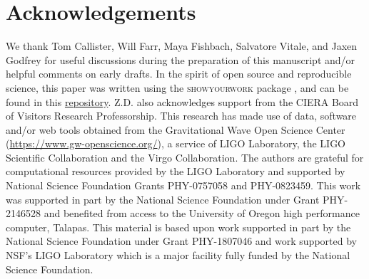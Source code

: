 \documentclass[twocolumn]{aastex631}
\begin{document}






\section{Acknowledgements}\label{sec:acknowledments}
We thank Tom Callister, Will Farr, Maya Fishbach, Salvatore Vitale, and Jaxen Godfrey for useful discussions during the 
preparation of this manuscript and/or helpful comments on early drafts. In the spirit of open source and 
reproducible science, this paper was written using the \textsc{showyourwork} package \citep{Luger2021}, and can be 
found in this \href{https://github.com/bruce-edelman/CoveringYourBasis}{repository}. Z.D. also acknowledges support from 
the CIERA Board of Visitors Research Professorship.  This research has made use of data, software and/or web tools obtained 
from the Gravitational Wave Open Science Center (\url{https://www.gw-openscience.org/}), a service of LIGO Laboratory, the 
LIGO Scientific Collaboration and the Virgo Collaboration. The authors are grateful for computational resources 
provided by the LIGO Laboratory and supported by National Science Foundation Grants PHY-0757058 and PHY-0823459.  
This work was supported in part by the National Science Foundation under Grant PHY-2146528 and benefited from access 
to the University of Oregon high performance computer, Talapas. This material is based upon work supported in part 
by the National Science Foundation under Grant PHY-1807046 and work supported by NSF's LIGO Laboratory which is a major 
facility fully funded by the National Science Foundation.


{}



\end{document}
